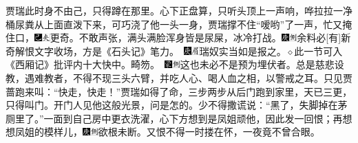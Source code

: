 贾瑞此时身不由己，只得蹲在那里。心下正盘算，只听头顶上一声响，哗拉拉一净桶尿粪从上面直泼下来，可巧浇了他一头一身，贾瑞撑不住“嗳哟”了一声，忙又掩住口，{\includegraphics[width=3mm]{../Images/00003}\includegraphics[width=3mm]{../Images/00012}\footnotesize \kaishu 更奇。}不敢声张，满头满脸浑身皆是尿屎，冰冷打战。{{\includegraphics[width=3mm]{../Images/00004}\includegraphics[width=3mm]{../Images/00011}\footnotesize \kaishu 余料必{[}有{]}新奇解恨文字收场，方是《石头记》笔力。　\includegraphics[width=3mm]{../Images/00004}\includegraphics[width=3mm]{../Images/00010}\footnotesize \kaishu 瑞奴实当如是报之。{$\diamond$}此一节可入《西厢记》批评内十大快中。畸笏。　}\includegraphics[width=3mm]{../Images/00006}\includegraphics[width=3mm]{../Images/00011}\footnotesize \kaishu 这也未必不是预为埋伏者。总是慈悲设教，遇难教者，不得不现三头六臂，并吃人心、喝人血之相，以警戒之耳。}只见贾蔷跑来叫：“快走，快走！”贾瑞如得了命，三步两步从后门跑到家里，天已三更，只得叫门。开门人见他这般光景，问是怎的。少不得撒谎说：“黑了，失脚掉在茅厕里了。”一面到自己房中更衣洗濯，心下方想到是凤姐顽他，因此发一回恨；再想想凤姐的模样儿，{\includegraphics[width=3mm]{../Images/00004}\includegraphics[width=3mm]{../Images/00011}\footnotesize \kaishu 欲根未断。}又恨不得一时搂在怀，一夜竟不曾合眼。

